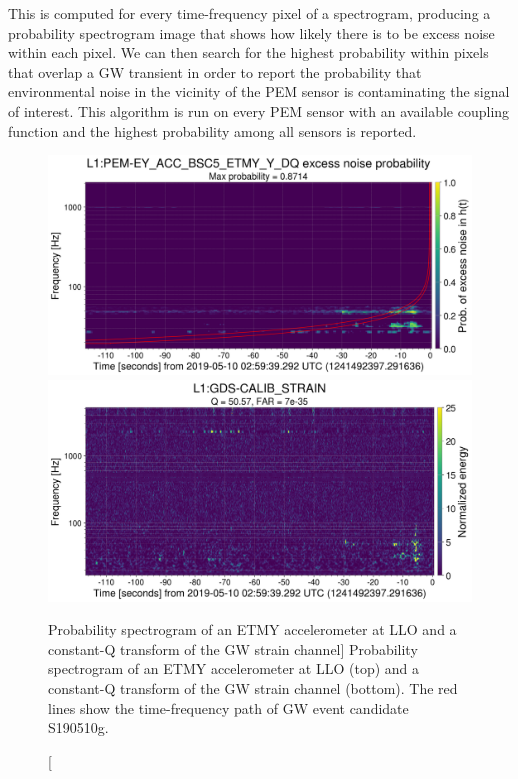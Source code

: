 This is computed for every time-frequency pixel of a spectrogram, producing a probability spectrogram image that shows how likely there is to be excess noise within each pixel.
We can then search for the highest probability within pixels that overlap a \ac{GW} transient in order to report the probability that environmental noise in the vicinity of the \ac{PEM} sensor is contaminating the signal of interest.
This algorithm is run on every \ac{PEM} sensor with an available coupling function and the highest probability among all sensors is reported.

\begin{figure}
	\includegraphics[width=\textwidth]{figures/noise-studies/vetting-spectrogram1.png}
	\includegraphics[width=\textwidth]{figures/noise-studies/vetting-spectrogram2.png}
	\caption
	[Probability spectrogram of an ETMY accelerometer at LLO and a constant-Q transform of the GW strain channel]
	{
		Probability spectrogram of an ETMY accelerometer at LLO (top) and a constant-Q transform of the GW strain channel (bottom).
		The red lines show the time-frequency path of GW event candidate S190510g.}
	\label{fig:vetting-spectrograms}
\end{figure}

